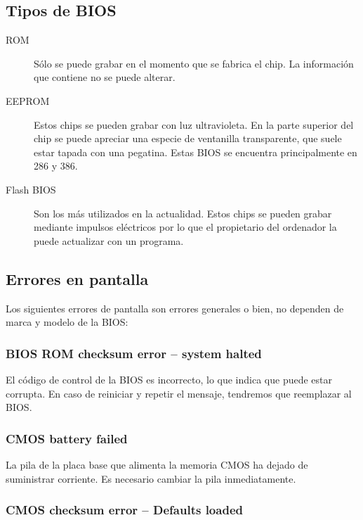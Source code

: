 	\subsection{Tipos de BIOS}\label{sub:chips bios}
		
		\begin{description}
			\item[ROM] Sólo se puede grabar en el momento que se fabrica el
				chip. La información que contiene no se puede alterar.
			\item[EEPROM] Estos chips se pueden grabar con luz ultravioleta. En
				la parte superior del chip se puede apreciar una especie de
				ventanilla transparente, que suele estar tapada con una
				pegatina. Estas BIOS se encuentra principalmente en 286 y 386.
				\cite{EEPROM}
			\item[Flash BIOS] Son los más utilizados en la actualidad. Estos
				chips se pueden grabar mediante impulsos eléctricos por lo que
				el propietario del ordenador la puede actualizar con un
				programa.
		\end{description}

	\subsection{Errores en pantalla}\label{sub:errores en pantalla}
	
	Los siguientes errores de pantalla son errores generales o bien, no
	dependen de marca y modelo de la BIOS:

		\subsubsection{BIOS ROM checksum error – system halted}

		El código de control de la BIOS es incorrecto, lo que indica que puede
		estar corrupta. En caso de reiniciar y repetir el mensaje, tendremos
		que reemplazar al BIOS.

		\subsubsection{CMOS battery failed}

		La pila de la placa base que alimenta la memoria CMOS ha dejado de
		suministrar corriente. Es necesario cambiar la pila inmediatamente.

		\subsubsection{CMOS checksum error – Defaults loaded}

